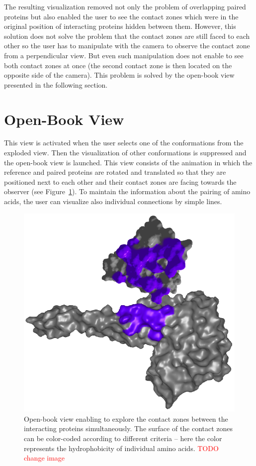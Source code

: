 \documentclass[journal]{vgtc}                %
\begin{document}
The resulting visualization removed not only the problem of overlapping paired proteins but also enabled the user to see the contact zones which were in the original position of interacting proteins hidden between them.
However, this solution does not solve the problem that the contact zones are still faced to each other so the user has to manipulate with the camera to observe the contact zone from a perpendicular view. 
But even such manipulation does not enable to see both contact zones at once (the second contact zone is then located on the opposite side of the camera).
This problem is solved by the open-book view presented in the following section.

\section{Open-Book View}
This view is activated when the user selects one of the conformations from the exploded view. 
Then the visualization of other conformations is suppressed and the open-book view is launched.
This view consists of the animation in which the reference and paired proteins are rotated and translated so that they are positioned next to each other and their contact zones are facing towards the observer (see Figure~\ref{fig:book}). 
To maintain the information about the pairing of amino acids, the user can visualize also individual connections by simple lines.

\begin{figure}[bt]
  \centering
  \includegraphics[width=0.8\columnwidth]{book.png}
  \caption{Open-book view enabling to explore the contact zones between the interacting proteins simultaneously. The surface of the contact zones can be color-coded according to different criteria -- here the color represents the hydrophobicity of individual amino acids. \textcolor{red}{TODO change image}}
  \label{fig:book}
\end{figure}
\end{document}
